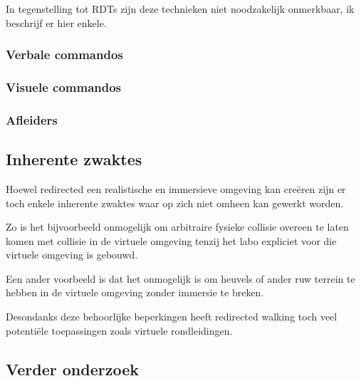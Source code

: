 \documentclass[a4paper,12pt]{article}
\begin{document}
In tegenstelling tot RDTs zijn deze technieken niet noodzakelijk onmerkbaar, ik
beschrijf er hier enkele.


\subsubsection{Verbale commandos}



\subsubsection{Visuele commandos}


\subsubsection{Afleiders}


\subsection{Inherente zwaktes}
Hoewel redirected een realistische en immersieve omgeving kan cre\"eren zijn er
toch enkele inherente zwaktes waar op zich niet omheen kan gewerkt worden.

Zo is het bijvoorbeeld onmogelijk om arbitraire fysieke collisie overeen te laten
komen met collisie in de virtuele omgeving tenzij het labo expliciet voor die
virtuele omgeving is gebouwd.

Een ander voorbeeld is dat het onmogelijk is om heuvels of ander ruw terrein te
hebben in de virtuele omgeving zonder immersie te breken.

Desondanks deze behoorlijke beperkingen heeft redirected walking toch veel
potenti\"ele toepassingen zoals virtuele rondleidingen.


\subsection{Verder onderzoek}


\newpage


\end{document}
